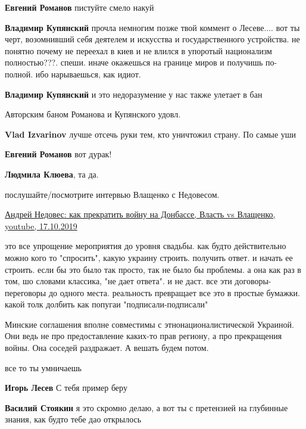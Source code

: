 \begin{itemize}
\begin{itemize}
\textbf{Евгений Романов} пистуйте смело накуй

\textbf{Владимир Купянский} прочла немногим позже твой коммент о Лесеве.... вот ты черт, возомнивший себя деятелем и искусства и государственного устройства.
не понятно почему не переехал в киев и не влился в упоротый национализм полностью???.
спеши. иначе окажешься на границе миров и получишь по-полной. ибо нарываешься, как идиот.

\textbf{Владимир Купянский} и это недоразумение у нас также улетает в бан

Авторским баном Романова и Купянского удовл.

\textbf{Vlad Izvarinov} лучше отсечь руки тем, кто уничтожил страну. По самые уши

\textbf{Евгений Романов} вот дурак!

\textbf{Людмила Клюева}, та да.

послушайте/посмотрите интервью Влащенко с Недовесом.

\href{https://www.youtube.com/watch?v=6S-Syu1cGHo}{%
Андрей Недовес: как прекратить войну на Донбассе, Власть vs Влащенко, youtube, 17.10.2019%
}

\end{itemize} %


это все упрощение мероприятия до уровня свадьбы. как будто действительно можно
кого то "спросить", какую украину строить. получить ответ. и начать ее строить.
если бы это было так просто, так не было бы проблемы. а она как раз в том, шо
словами классика, "не дает ответа". и не даст. все эти договоры-переговоры до
одного места. реальность превращает все это в простые бумажки. какой толк
долбить как попугаи "подписали-подписали"


Минские соглашения вполне совместимы с этнонационалистической Украиной. Они
ведь не про предоставление каких-то прав региону, а про прекращения войны. Она
соседей раздражает. А вешать будем потом.

\begin{itemize} %
все то ты умничаешь

\textbf{Игорь Лесев} С тебя пример беру

\textbf{Василий Стоякин} я это скромно делаю, а вот ты с претензией на глубинные знания, как будто тебе дао открылось


\end{itemize}
\end{itemize}
